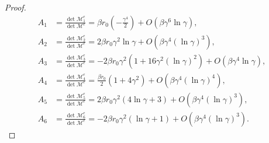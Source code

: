 \documentclass[11pt,letterpaper]{amsart}
\newcommand{\mM}{\mathcal{M}}
\theoremstyle{definition}
\theoremstyle{remark}
\numberwithin{equation}{section}
\begin{document}
\begin{proof}
\begin{equation}
\begin{split}
A_1&=\frac{\det \mM^e_1}{\det \mM^e}=\beta r_0\left(-\frac{\gamma^4}{2}\right)+O(\beta\gamma^6\ln \gamma),\\
A_2&=\frac{\det \mM^e_2}{\det \mM^e}=2\beta r_0\gamma^2\ln \gamma+O(\beta\gamma^4(\ln \gamma)^3),\\
A_3&=\frac{\det \mM^e_3}{\det \mM^e}=-2\beta r_0\gamma^2\left(1+16\gamma^2(\ln \gamma)^2\right)+O(\beta\gamma^4\ln \gamma),\\
A_4&=\frac{\det \mM^e_4}{\det \mM^e}=\frac{\beta r_0}{2}\left(1+4\gamma^2\right)+O(\beta\gamma^4(\ln \gamma)^4),\\
A_5&=\frac{\det \mM^e_5}{\det \mM^e}=2\beta r_0\gamma^2\left(4\ln \gamma+3\right)+O(\beta\gamma^4(\ln \gamma)^3),\\
A_6&=\frac{\det \mM^e_6}{\det \mM^e}=-2\beta r_0\gamma^2 \left(\ln \gamma+1\right)+O(\beta\gamma^4(\ln \gamma)^3).
\end{split}
\end{equation}
\end{proof}
\end{document}
